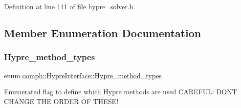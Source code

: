 Definition at line 141 of file hypre\+\_\+solver.\+h.



\subsection{Member Enumeration Documentation}
\mbox{\label{classoomph_1_1HypreInterface_a6326c42293c21c62a189c4bfee03e2ab}} 
\subsubsection{\texorpdfstring{Hypre\+\_\+method\+\_\+types}{Hypre\_method\_types}}
{\footnotesize\ttfamily enum \hyperlink{classoomph_1_1HypreInterface_a6326c42293c21c62a189c4bfee03e2ab}{oomph\+::\+Hypre\+Interface\+::\+Hypre\+\_\+method\+\_\+types}}



Enumerated flag to define which Hypre methods are used C\+A\+R\+E\+F\+UL\+: D\+ON\textquotesingle{}T C\+H\+A\+N\+GE T\+HE O\+R\+D\+ER OF T\+H\+E\+S\+E! 


